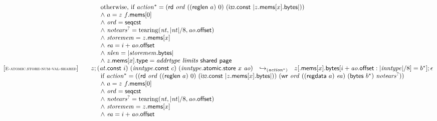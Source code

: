 $$\begin{array}[t]{@{}lrcl@{}l@{}}
& \multicolumn{4}{@{}l@{}}{\quad
\quad
\begin{array}[t]{@{}l@{}}
\mbox{otherwise, if}~ {{\mathit{action}}^\ast} = (\mathsf{rd}~{\mathit{ord}}~((\mathsf{reglen}~a)~0)~(\mathsf{i{\scriptstyle 32}}{.}\mathsf{const}~{|z{.}\mathsf{mems}{}[x]{.}\mathsf{bytes}|})) \\
{\land}~ a = z~f{.}\mathsf{mems}{}[0] \\
{\land}~ {\mathit{ord}} = \mathsf{seqcst} \\
{\land}~ {{\mathit{notears}}^?} = {\mathrm{tearing}}({\mathit{nt}}, {|{\mathit{nt}}|} / 8, {\mathit{ao}}{.}\mathsf{offset}) \\
{\land}~ {\mathit{storemem}} = z{.}\mathsf{mems}{}[x] \\
{\land}~ {\mathit{ea}} = i + {\mathit{ao}}{.}\mathsf{offset} \\
{\land}~ {\mathit{nlen}} = {|{\mathit{storemem}}{.}\mathsf{bytes}|} \\
{\land}~ z{.}\mathsf{mems}{}[x]{.}\mathsf{type} = {\mathit{addrtype}}~{\mathit{limits}}~\mathsf{shared}~\mathsf{page} \\
\end{array}
} \\
{[\textsc{\scriptsize E{-}atomic.store{-}num{-}val{-}shared}]} \quad & z ; ({\mathit{at}}{.}\mathsf{const}~i)~({\mathit{inntype}}{.}\mathsf{const}~c)~({\mathit{inntype}}{.}\mathsf{atomic}{.}\mathsf{store}~x~{\mathit{ao}}) & {\hookrightarrow}_{({{\mathit{action}}^\ast})} {} & z{}[{.}\mathsf{mems}{}[x]{.}\mathsf{bytes}{}[i + {\mathit{ao}}{.}\mathsf{offset} : {|{\mathit{inntype}}|} / 8] = {b^\ast}] ; \epsilon &  \\
& \multicolumn{4}{@{}l@{}}{\quad
\quad
\begin{array}[t]{@{}l@{}}
\mbox{if}~ {{\mathit{action}}^\ast} = ((\mathsf{rd}~{\mathit{ord}}~((\mathsf{reglen}~a)~0)~(\mathsf{i{\scriptstyle 32}}{.}\mathsf{const}~{|z{.}\mathsf{mems}{}[x]{.}\mathsf{bytes}|}))~(\mathsf{wr}~{\mathit{ord}}~((\mathsf{regdata}~a)~{\mathit{ea}})~(\mathsf{bytes}~{b^\ast})~{{\mathit{notears}}^?})) \\
{\land}~ a = z~f{.}\mathsf{mems}{}[0] \\
{\land}~ {\mathit{ord}} = \mathsf{seqcst} \\
{\land}~ {{\mathit{notears}}^?} = {\mathrm{tearing}}({\mathit{nt}}, {|{\mathit{nt}}|} / 8, {\mathit{ao}}{.}\mathsf{offset}) \\
{\land}~ {\mathit{storemem}} = z{.}\mathsf{mems}{}[x] \\
{\land}~ {\mathit{ea}} = i + {\mathit{ao}}{.}\mathsf{offset} \\

\end{array}}
\end{array}$$
